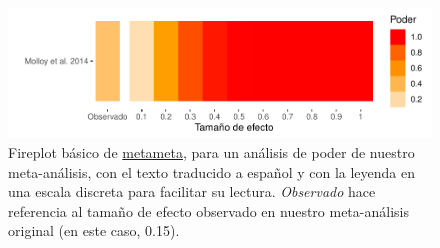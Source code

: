 \documentclass[
  bookmarksnumbered]{article}
\newenvironment{Shaded}{\begin{snugshade}}{\end{snugshade}}
\newcommand{\AttributeTok}[1]{\textcolor[rgb]{0.00,0.34,0.68}{#1}}
\newcommand{\ConstantTok}[1]{\textcolor[rgb]{0.67,0.33,0.00}{#1}}
\newcommand{\DecValTok}[1]{\textcolor[rgb]{0.69,0.50,0.00}{#1}}
\newcommand{\FloatTok}[1]{\textcolor[rgb]{0.69,0.50,0.00}{#1}}
\newcommand{\FunctionTok}[1]{\textcolor[rgb]{0.39,0.29,0.61}{#1}}
\newcommand{\NormalTok}[1]{\textcolor[rgb]{0.12,0.11,0.11}{#1}}
\newcommand{\OtherTok}[1]{\textcolor[rgb]{0.00,0.43,0.16}{#1}}
\newcommand{\SpecialCharTok}[1]{\textcolor[rgb]{0.24,0.68,0.91}{#1}}
\newcommand{\StringTok}[1]{\textcolor[rgb]{0.75,0.01,0.01}{#1}}
\begin{document}
\begin{Shaded}
\end{Shaded}

\begin{figure}
\centering
\includegraphics{Meta-analysis_files/figure-latex/fire-plot2-1.pdf}
\caption{\label{fig:fire-plot2}Fireplot básico de \href{https://www.dsquintana.blog/metameta-r-package-meta-analysis/}{metameta}, para un análisis de poder de nuestro meta-análisis, con el texto traducido a español y con la leyenda en una escala discreta para facilitar su lectura. \emph{Observado} hace referencia al tamaño de efecto observado en nuestro meta-análisis original (en este caso, 0.15).}
\end{figure}
\end{document}

